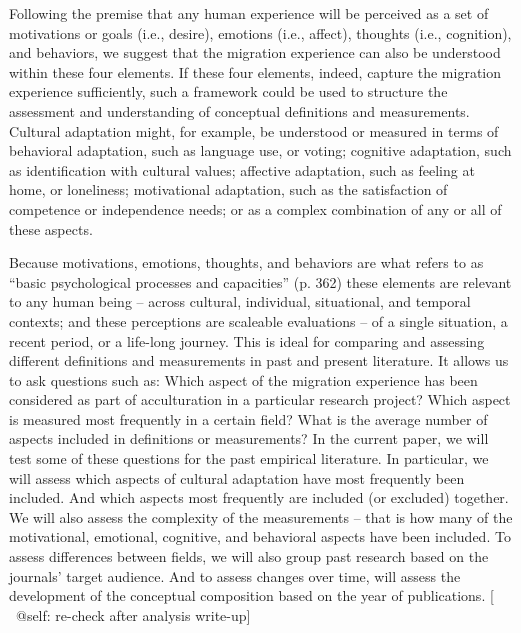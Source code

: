 \documentclass[man, 12pt, a4paper]{apa7}
\newcommand\Warning[1][2ex]{%
  \renewcommand\stacktype{L}%
  \scaleto{\stackon[1.3pt]{\color{red}$\triangle$}{\tiny\bfseries !}}{#1}}%
\begin{document}
\vspace{1em}
Following the premise that any human experience will be perceived as a set of motivations or goals (i.e., desire), emotions (i.e., affect), thoughts (i.e., cognition), and behaviors, we suggest that the migration experience can also be understood within these four elements. If these four elements, indeed, capture the migration experience sufficiently, such a framework could be used to structure the assessment and understanding of conceptual definitions and measurements. Cultural adaptation might, for example, be understood or measured in terms of behavioral adaptation, such as language use, or voting; cognitive adaptation, such as identification with cultural values; affective adaptation, such as feeling at home, or loneliness; motivational adaptation, such as the satisfaction of competence or independence needs; or as a complex combination of any or all of these aspects. 

\vspace{1em}
Because motivations, emotions, thoughts, and behaviors are what \citet{Berry2009a} refers to as ``basic psychological processes and capacities'' (p. 362) these elements are relevant to any human being -- across cultural, individual, situational, and temporal contexts; and these perceptions are scaleable evaluations -- of a single situation, a recent period, or a life-long journey. This is ideal for comparing and assessing different definitions and measurements in past and present literature. It allows us to ask questions such as: Which aspect of the migration experience has been considered as part of acculturation in a particular research project? Which aspect is measured most frequently in a certain field? What is the average number of aspects included in definitions or measurements? 
In the current paper, we will test some of these questions for the past empirical literature. In particular, we will assess which aspects of cultural adaptation have most frequently been included. And which aspects most frequently are included (or excluded) together. We will also assess the complexity of the measurements -- that is how many of the motivational, emotional, cognitive, and behavioral aspects have been included. To assess differences between fields, we will also group past research based on the journals' target audience. And to assess changes over time, will assess the development of the conceptual composition based on the year of publications. [\Warning\ @self: re-check after analysis write-up]
\end{document}
